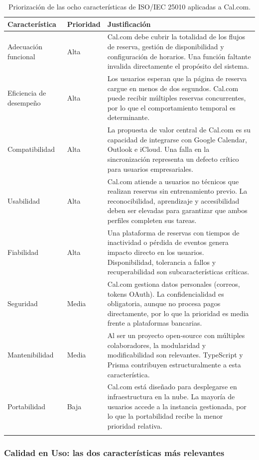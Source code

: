 \documentclass{article}
\begin{document}
\begin{longtable}{|p{3.5cm}|p{2cm}|p{8cm}|}
\hline
\textbf{Característica} & \textbf{Prioridad} & \textbf{Justificación} \\
\hline
Adecuación funcional & Alta & Cal.com debe cubrir la totalidad de los flujos de reserva, gestión de disponibilidad y configuración de horarios. Una función faltante invalida directamente el propósito del sistema. \\
\hline
Eficiencia de desempeño & Alta & Los usuarios esperan que la página de reserva cargue en menos de dos segundos. Cal.com puede recibir múltiples reservas concurrentes, por lo que el comportamiento temporal es determinante. \\
\hline
Compatibilidad & Alta & La propuesta de valor central de Cal.com es su capacidad de integrarse con Google Calendar, Outlook e iCloud. Una falla en la sincronización representa un defecto crítico para usuarios empresariales. \\
\hline
Usabilidad & Alta & Cal.com atiende a usuarios no técnicos que realizan reservas sin entrenamiento previo. La reconocibilidad, aprendizaje y accesibilidad deben ser elevadas para garantizar que ambos perfiles completen sus tareas. \\
\hline
Fiabilidad & Alta & Una plataforma de reservas con tiempos de inactividad o pérdida de eventos genera impacto directo en los usuarios. Disponibilidad, tolerancia a fallos y recuperabilidad son subcaracterísticas críticas. \\
\hline
Seguridad & Media & Cal.com gestiona datos personales (correos, tokens OAuth). La confidencialidad es obligatoria, aunque no procesa pagos directamente, por lo que la prioridad es media frente a plataformas bancarias. \\
\hline
Mantenibilidad & Media & Al ser un proyecto open-source con múltiples colaboradores, la modularidad y modificabilidad son relevantes. TypeScript y Prisma contribuyen estructuralmente a esta característica. \\
\hline
Portabilidad & Baja & Cal.com está diseñado para desplegarse en infraestructura en la nube. La mayoría de usuarios accede a la instancia gestionada, por lo que la portabilidad recibe la menor prioridad relativa. \\
\hline
\caption{Priorización de las ocho características de ISO/IEC 25010 aplicadas a Cal.com.}
\end{longtable}

\subsubsection{Calidad en Uso: las dos características más relevantes}
\end{document}
